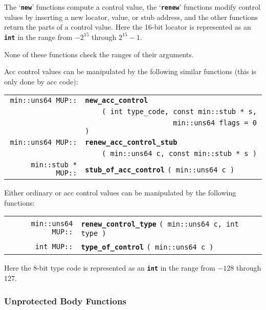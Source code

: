 \documentclass[12pt]{article}
\makeatletter
\newcommand{\TT}[1]{{\tt \bfseries #1}}
\newcommand{\ttindex}[1]{\index{#1@{\tt #1}}}
\newenvironment{indpar}[1][0.3in]%
	{\begin{list}{}%
		     {\setlength{\itemsep}{0in}%
		      \setlength{\topsep}{0in}%
		      \setlength{\parsep}{1ex}%
		      \setlength{\labelwidth}{#1}%
		      \setlength{\leftmargin}{#1}%
		      \addtolength{\leftmargin}{\labelsep}}%
	 \item}%
	{\end{list}}
\newcommand{\LABEL}[1]{\label{#1}}
\newcommand{\MUPKEY}[1]%
	   {\TT{#1}\ttindex{MUP::#1}\ttindex{#1}}
\makeatother
\begin{document}
The `\TT{new}' functions compute a control value,
the `\TT{renew}' functions modify control values
by inserting a new locator, value, or stub address, and
the other functions return the parts of a control value.
Here the 16-bit locator is represented as an \TT{int}
in the range from $-2^{15}$ through $2^{15}-1$.

None of these functions check the ranges of their arguments.

Acc control values can be manipulated by the following similar functions
(this is only done by acc code):

\begin{indpar}\begin{tabular}{@{}r@{}l@{}}
\verb|min::uns64 MUP::|
    & \MUPKEY{new\_acc\_control} \\
    & \verb|    ( int type_code, const min::stub * s,| \\
    & \verb|                     min::uns64 flags = 0 )|
\LABEL{MUP::NEW_ACC_CONTROL_OF_STUB} \\
\verb|min::uns64 MUP::|
    & \MUPKEY{renew\_acc\_control\_stub} \\
    & \verb|    ( min::uns64 c, const min::stub * s )|
\LABEL{MUP::RENEW_ACC_CONTROL_STUB} \\
\verb|min::stub * MUP::|
    & \MUPKEY{stub\_of\_acc\_control} \verb|( min::uns64 c )|
\LABEL{MUP::STUB_OF_ACC_CONTROL} \\
\end{tabular}\end{indpar}

Either ordinary or acc control values can be
manipulated by the following functions:

\begin{indpar}\begin{tabular}{@{}r@{}l@{}}
\verb|min::uns64 MUP::|
    & \MUPKEY{renew\_control\_type} \verb|( min::uns64 c, int type )|
\LABEL{MUP::RENEW_CONTROL_TYPE} \\
\verb|int MUP::| & \MUPKEY{type\_of\_control} \verb|( min::uns64 c )|
\LABEL{MUP::TYPE_OF_CONTROL} \\
\end{tabular}\end{indpar}

Here the 8-bit type code is represented as an \TT{int} in
the range from $-128$ through $127$.

\subsubsection{Unprotected Body Functions}
\label{UNPROTECTED-BODY-FUNCTIONS}
\end{document}
